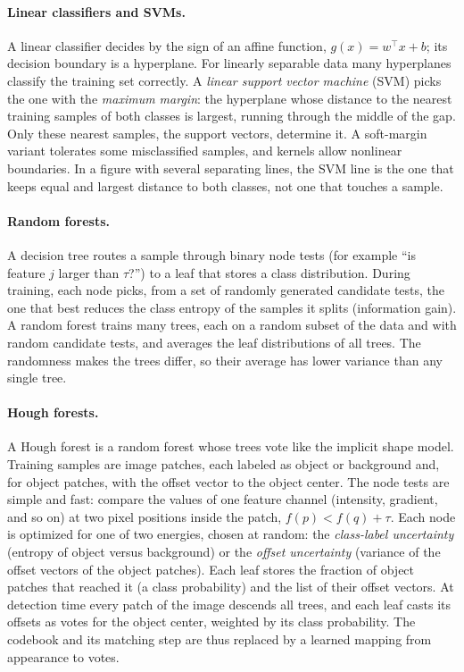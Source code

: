 \paragraph{Linear classifiers and SVMs.}
A linear classifier decides by the sign of an affine function,
$g(x) = w^\top x + b$; its decision boundary is a hyperplane. For linearly
separable data many hyperplanes classify the training set correctly. A
\emph{linear support vector machine} (SVM) picks the one with the
\emph{maximum margin}: the hyperplane whose distance to the nearest training
samples of both classes is largest, running through the middle of the gap. Only
these nearest samples, the support vectors, determine it. A soft-margin variant
tolerates some misclassified samples, and kernels allow nonlinear boundaries.
In a figure with several separating lines, the SVM line is the one that keeps
equal and largest distance to both classes, not one that touches a sample.

\paragraph{Random forests.}
A decision tree routes a sample through binary node tests (for example ``is
feature $j$ larger than $\tau$?'') to a leaf that stores a class distribution.
During training, each node picks, from a set of randomly generated candidate
tests, the one that best reduces the class entropy of the samples it splits
(information gain). A random forest trains many trees, each on a random subset
of the data and with random candidate tests, and averages the leaf
distributions of all trees. The randomness makes the trees differ, so their
average has lower variance than any single tree.

\paragraph{Hough forests.}
A Hough forest is a random forest whose trees vote like the implicit shape
model. Training samples are image patches, each labeled as object or background
and, for object patches, with the offset vector to the object center. The node
tests are simple and fast: compare the values of one feature channel (intensity,
gradient, and so on) at two pixel positions inside the patch,
$f(p) < f(q) + \tau$. Each node is optimized for one of two energies, chosen at
random: the \emph{class-label uncertainty} (entropy of object versus background)
or the \emph{offset uncertainty} (variance of the offset vectors of the object
patches). Each leaf stores the fraction of object patches that reached it (a
class probability) and the list of their offset vectors. At detection time every
patch of the image descends all trees, and each leaf casts its offsets as votes
for the object center, weighted by its class probability. The codebook and its
matching step are thus replaced by a learned mapping from appearance to votes.


